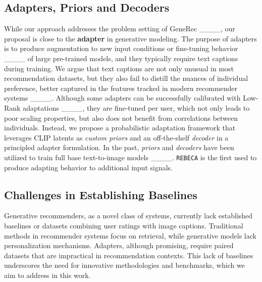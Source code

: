 \subsection{Adapters, Priors and Decoders}
While our approach addresses the problem setting of GeneRec ____, our proposal is close to the \textbf{adapter} in generative modeling. The purpose of adapters is to produce augmentation to new input conditions or fine-tuning behavior ____ of large pre-trained models, and they typically require text captions during training. We argue that text captions are not only unusual in most recommendation datasets, but they also fail to distill the nuances of individual preference, better captured in the features tracked in modern recommender systems ____. Although some adapters can be successfully calibrated with Low-Rank adaptations ____, they are fine-tuned  per user, which not only leads to poor scaling properties, but also does not benefit from correlations between individuals. Instead, we propose a probabilistic adaptation framework that leverages CLIP latents as \textit{custom priors} and an off-the-shelf \textit{decoder} in a principled adapter formulation. In the past, \textit{priors} and \textit{decoders} have been utilized to train full base text-to-image models ____. \texttt{REBECA} is the first used to produce adapting behavior to additional input signals.


\subsection{Challenges in Establishing Baselines} 


Generative recommenders, as a novel class of systems, currently lack established baselines or datasets combining user ratings with image captions. Traditional methods in recommender systems focus on retrieval, while generative models lack personalization mechanisms. Adapters, although promising, require paired datasets that are impractical in recommendation contexts. This lack of baselines underscores the need for innovative methodologies and benchmarks, which we aim to address in this work.